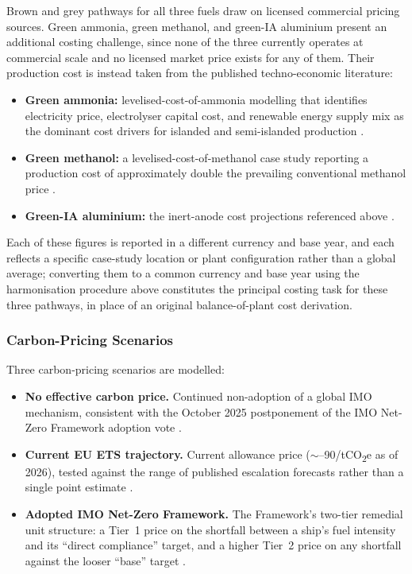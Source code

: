 \documentclass[12pt]{article}
\begin{document}
Brown and grey pathways for all three fuels draw on licensed commercial pricing 
sources. Green ammonia, green methanol, and green-IA aluminium present an 
additional costing challenge, since none of the three currently operates at 
commercial scale and no licensed market price exists for any of them. Their 
production cost is instead taken from the published techno-economic literature:

\begin{itemize}
    \item \textbf{Green ammonia:} levelised-cost-of-ammonia modelling that 
    identifies electricity price, electrolyser capital cost, and renewable energy 
    supply mix as the dominant cost drivers for islanded and semi-islanded 
    production \cite{nayak-luke-green-ammonia,campion-green-ammonia}.

    \item \textbf{Green methanol:} a levelised-cost-of-methanol case study 
    reporting a production cost of approximately double the prevailing 
    conventional methanol price \cite{methanol-TEA}.

    \item \textbf{Green-IA aluminium:} the inert-anode cost projections 
    referenced above \cite{boudreau-aluminium-tea}.
\end{itemize}

Each of these figures is reported in a different currency and base year, and 
each reflects a specific case-study location or plant configuration rather than a 
global average; converting them to a common currency and base year using the 
harmonisation procedure above constitutes the principal costing task for these 
three pathways, in place of an original balance-of-plant cost derivation.

\subsubsection*{Carbon-Pricing Scenarios}

Three carbon-pricing scenarios are modelled:

\begin{itemize}
    \item \textbf{No effective carbon price.} Continued non-adoption of a global 
    IMO mechanism, consistent with the October 2025 postponement of the IMO 
    Net-Zero Framework adoption vote \cite{dnv-imo-net-zero-delay}.

    \item \textbf{Current EU ETS trajectory.} Current allowance price 
    ($\sim$--90/tCO\textsubscript{2}e as of 2026), tested against the 
    range of published escalation forecasts rather than a single point estimate 
    \cite{eu-ets-2026}.

    \item \textbf{Adopted IMO Net-Zero Framework.} The Framework's two-tier 
    remedial unit structure: a Tier~1 price on the shortfall between a ship's 
    fuel intensity and its ``direct compliance'' target, and a higher Tier~2 
    price on any shortfall against the looser ``base'' target 
    \cite{dnv-imo-net-zero-delay}.
\end{itemize}
\end{document}
